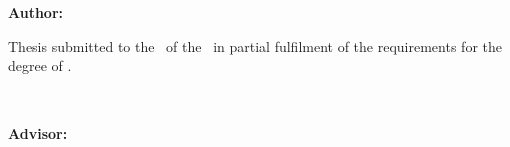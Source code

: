 \begin{titlepage}


	\thispagestyle{frontpage}

	\begin{center}

		\vspace*{4\baselineskip}


		{\Huge \textbf{\ThesisTitle\\}}%
		\vspace*{1.5\baselineskip}

		\large{\textit{\ThesisSubtitle}}\\ %

		\vspace*{1.5\baselineskip}

		\large{\textbf{Author: \ThesisAuthor}}\\ %

		\vspace{1.5\baselineskip}

		\large{Thesis submitted to the \ThesisFaculty\ of the \ThesisUniversity\ in partial fulfilment of the requirements for the degree of \ThesisProgram.} %

		\vspace{1.5\baselineskip}
		\ThesisMonth\ \ThesisYear\\ %
		\ThesisLocation %
		\vspace{1.5\baselineskip}

		\large{\textbf{Advisor: \ThesisAdvisor}}\\ %


	\end{center}



\end{titlepage}
